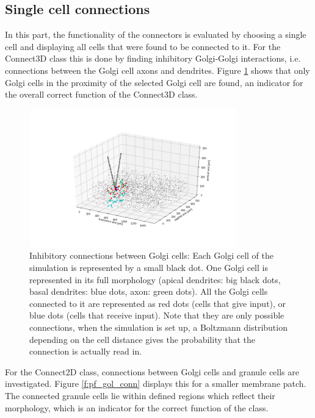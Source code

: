 \documentclass[12pt]{report}
\begin{document}
\subsection{Single cell connections}
In this part, the functionality of the connectors is evaluated by choosing a single cell and displaying all cells that were found to be connected to it. For the Connect\textunderscore 3D class this is done by finding inhibitory Golgi-Golgi interactions, i.e. connections between the Golgi cell axons and dendrites. Figure \ref{f:gogo_conn} shows that only Golgi cells in the proximity of the selected Golgi cell are found, an indicator for the overall correct function of the Connect\textunderscore 3D class.

\begin{figure}[!ht]
	\centering
	\includegraphics[width=0.8\textwidth]{./figures/gogo_one_cell_conn.png}
	\caption{Inhibitory connections between Golgi cells: Each Golgi cell of the simulation is represented by a small black dot. One Golgi cell is represented in its full morphology (apical dendrites: big black dots, basal dendrites: blue dots, axon: green dots). All the Golgi cells connected to it are represented as red dots (cells that give input), or blue dots (cells that receive input). Note that they are only possible connections, when the simulation is set up, a Boltzmann distribution depending on the cell distance gives the probability that the connection is actually read in.}
	\centering
	\label{f:gogo_conn}
\end{figure}


For the Connect\textunderscore 2D class, connections between Golgi cells and granule cells are investigated. Figure \ref{f:pf_gol_conn} displays this for a smaller membrane patch. The connected granule cells lie within defined regions which reflect their morphology, which is an indicator for the correct function of the class. 
\end{document}

